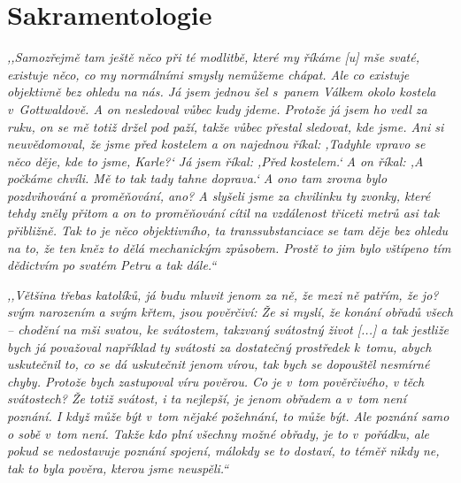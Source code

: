 \section{Sakramentologie}

\textit{%
,,Samozřejmě tam ještě něco při té modlitbě, které my říkáme [u] mše svaté,
existuje něco, co my normálními smysly nemůžeme chápat. Ale co existuje
objektivně bez ohledu na nás. Já jsem jednou šel s~panem Válkem okolo kostela
v~Gottwaldově. A on nesledoval vůbec kudy jdeme. Protože já jsem ho vedl za
ruku, on se mě totiž držel pod paží, takže vůbec přestal sledovat, kde jsme. Ani
si neuvědomoval, že jsme před kostelem a on najednou říkal: ,Tadyhle vpravo se
něco děje, kde to jsme, Karle?{}` Já jsem říkal: ,Před kostelem.` A on říkal: ,A
počkáme chvíli. Mě to tak tady tahne doprava.` A ono tam zrovna bylo
pozdvihování a proměňování, ano? A slyšeli jsme za chvilinku ty zvonky, které
tehdy zněly přitom a on to proměňování cítil na vzdálenost třiceti metrů asi tak
přibližně. Tak to je něco objektivního, ta transsubstanciace se tam děje bez
ohledu na to, že ten kněz to dělá mechanickým způsobem. Prostě to jim bylo
vštípeno tím dědictvím po svatém Petru a tak dále.``
}

\textit{%
,,Většina třebas katolíků, já budu mluvit jenom za ně, že mezi ně patřím, že jo?
svým narozením a svým křtem, jsou pověrčiví: Že si myslí, že konání obřadů všech
-- chodění na mši svatou, ke svátostem, takzvaný svátostný život [...] a tak
jestliže bych já považoval například ty svátosti za dostatečný prostředek
k~tomu, abych uskutečnil to, co se dá uskutečnit jenom vírou, tak bych se
dopouštěl nesmírné chyby. Protože bych zastupoval víru pověrou. Co je v~tom
pověrčivého, v těch svátostech? Že totiž svátost, i ta nejlepší, je jenom
obřadem a v~tom není poznání. I když může být v~tom nějaké požehnání, to může
být. Ale poznání samo o sobě v~tom není. Takže kdo plní všechny možné obřady, je
to v~pořádku, ale pokud se nedostavuje poznání spojení, málokdy se to dostaví,
to téměř nikdy ne, tak to byla pověra, kterou jsme neuspěli.``
}

